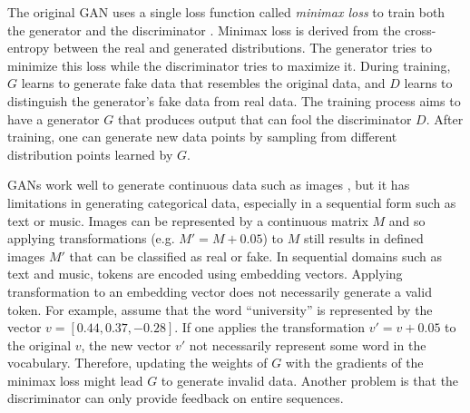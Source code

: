 The original GAN uses a single loss function called \textit{minimax loss} to train both the generator and the discriminator \cite{goodfellow2014generative}. Minimax loss is derived from the cross-entropy between the real and generated distributions. The generator tries to minimize this loss while the discriminator tries to maximize it.
%
During training, $G$ learns to generate fake data that resembles the original data, and $D$ learns to distinguish the generator's fake data from real data. The training process aims to have a generator $G$ that produces output that can fool the discriminator $D$. After training, one can generate new data points by sampling from different distribution points learned by $G$.

GANs work well to generate continuous data such as images \cite{brock2018large}, but it has limitations in generating categorical data, especially in a sequential form such as text or music. Images can be represented by a continuous matrix $M$ and so applying transformations (e.g. $M' = M + 0.05$) to $M$ still results in defined images $M'$ that can be classified as real or fake. In sequential domains such as text and music, tokens are encoded using embedding vectors. Applying transformation to an embedding vector does not necessarily generate a valid token. For example, assume that the word ``university'' is represented by the vector $v = [0.44, 0.37, -0.28]$. If one applies the transformation $v' = v + 0.05$ to the original $v$, the new vector $v'$ not necessarily represent some word in the vocabulary. Therefore, updating the weights of $G$ with the gradients of the minimax loss might lead $G$ to generate invalid data. Another problem is that the discriminator can only provide feedback on entire sequences.

